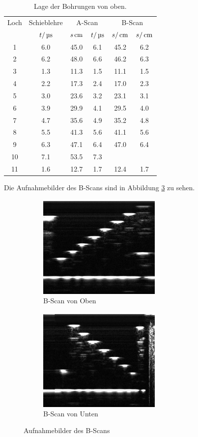 \begin{table}[H]
  \centering
  \begin{tabular}{cc|cc|cc}
    \toprule
    \multicolumn{1}{c}{Loch}& \multicolumn{1}{c|}{Schieblehre} & \multicolumn{2}{c|}{A-Scan}
    & \multicolumn{2}{c}{B-Scan} \\
    & $t/\,\si{\micro\second}$ & $s\,\si{\centi\meter}$ & $t/\,\si{\micro\second}$ & $s/\,\si{\centi\meter}$ & $s/\,\si{\centi\meter}$ \\
    \midrule
     1  &   6.0 &  45.0 & 6.1 & 45.2 & 6.2 \\
     2  &   6.2 &  48.0 & 6.6 & 46.2 & 6.3 \\
     3  &   1.3 &  11.3 & 1.5 & 11.1 & 1.5 \\
     4  &   2.2 &  17.3 & 2.4 & 17.0 & 2.3 \\
     5  &   3.0 &  23.6 & 3.2 & 23.1 & 3.1 \\
     6  &   3.9 &  29.9 & 4.1 & 29.5 & 4.0 \\
     7  &   4.7 &  35.6 & 4.9 & 35.2 & 4.8 \\
     8  &   5.5 &  41.3 & 5.6 & 41.1 & 5.6 \\
     9  &   6.3 &  47.1 & 6.4 & 47.0 & 6.4 \\
    10  &   7.1 &  53.5 & 7.3 & \hrulefill & \hrulefill \\
    11  &   1.6 &  12.7 & 1.7 & 12.4 & 1.7 \\
    \bottomrule
  \end{tabular}
  \caption{Lage der Bohrungen von oben.}
  \label{tab:unten}
\end{table}
Die Aufnahmebilder des B-Scans sind in Abbildung \ref{fig:bscan} zu sehen.
\begin{figure}[H]
  \centering
  \begin{subfigure}{0.4\textwidth}
    \includegraphics[width=6cm]{bilder/B-ScanUnten.jpg}
    \caption{B-Scan von Oben}
    \label{sub:oben}
  \end{subfigure}
  \begin{subfigure}{0.4\textwidth}
  \includegraphics[width=6cm]{bilder/B-ScanOben.jpg}
  \caption{B-Scan von Unten}
  \label{sub:unten}
\end{subfigure}
\caption{Aufnahmebilder des B-Scans}
\label{fig:bscan}
\end{figure}
